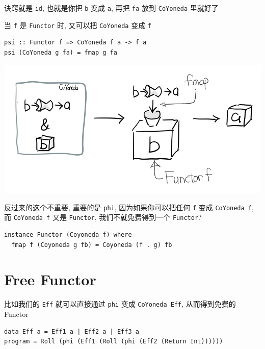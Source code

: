 \documentclass[letterspacing]{tufte-book}
\begin{document}
诀窍就是 \texttt{id}, 也就是你把 \texttt{b} 变成 \texttt{a}, 再把 \texttt{fa} 放到 \texttt{CoYoneda} 里就好了

当 \texttt{f} 是 \texttt{Functor} 时, 又可以把 \texttt{CoYoneda} 变成 \texttt{f}

\lstset{language=haskell,label= ,caption= ,captionpos=b,numbers=none}
\begin{lstlisting}
psi :: Functor f => CoYoneda f a -> f a
psi (CoYoneda g fa) = fmap g fa
\end{lstlisting}

\begin{center}
\includegraphics[width=.9\linewidth]{images/p3-CoYoneda-psi.png}
\end{center}

反过来的这个不重要, 重要的是 \texttt{phi}, 因为如果你可以把任何 \texttt{f} 变成 \texttt{CoYoneda f}, 而 \texttt{CoYoneda f} 又是 \texttt{Functor},
我们不就免费得到一个 \texttt{Functor}?

\lstset{language=haskell,label= ,caption= ,captionpos=b,numbers=none}
\begin{lstlisting}
instance Functor (Coyoneda f) where
  fmap f (Coyoneda g fb) = Coyoneda (f . g) fb
\end{lstlisting}

\section{Free Functor}
\label{sec:orged06f0c}
比如我们的 \texttt{Eff} 就可以直接通过 \texttt{phi} 变成 \texttt{CoYoneda Eff}, 从而得到免费的 Functor

\lstset{language=haskell,label= ,caption= ,captionpos=b,numbers=none}
\begin{lstlisting}
data Eff a = Eff1 a | Eff2 a | Eff3 a
program = Roll (phi (Eff1 (Roll (phi (Eff2 (Return Int))))))
\end{lstlisting}
\end{document}
